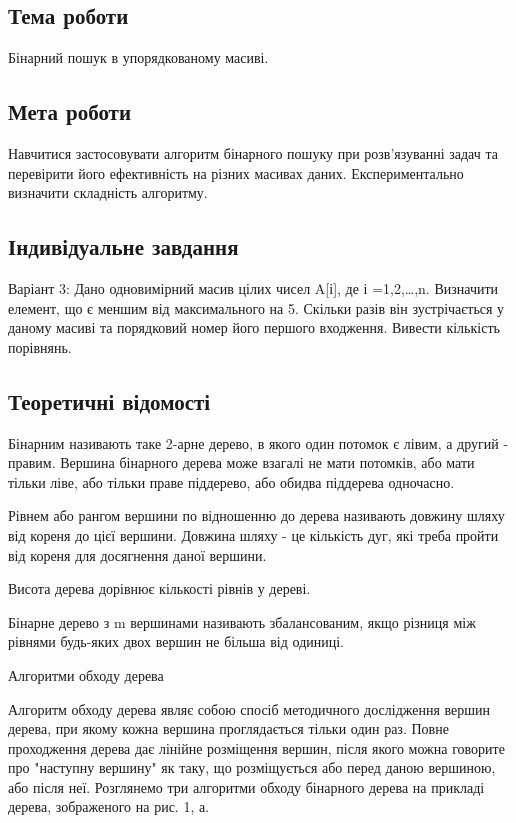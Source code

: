 \documentclass[12pt]{extarticle}
\begin{document}
\subsection*{Тема роботи} 
Бінарний пошук в упорядкованому масиві.

\subsection*{Мета роботи} Навчитися застосовувати алгоритм бінарного пошуку при розв’язуванні задач та перевірити його ефективність на різних масивах даних. Експериментально визначити складність алгоритму.

\subsection*{Індивідуальне завдання}
Варіант 3: Дано одновимірний масив цілих чисел A[і], де і =1,2,…,n. Визначити елемент, що є меншим від максимального на 5. Скільки разів він зустрічається у даному масиві та порядковий номер його першого входження. Вивести кількість порівнянь.

\subsection*{Теоретичні відомості}
Бінарним називають таке 2-арне дерево, в якого один потомок є лівим, а другий - правим. Вершина бінарного дерева може взагалі не мати потомків, або мати тільки ліве, або тільки праве піддерево, або обидва піддерева одночасно.

Рівнем або рангом вершини по відношенню до дерева називають довжину шляху від кореня до цієї вершини. Довжина шляху - це кількість дуг, які треба пройти від кореня для досягнення даної вершини.

Висота дерева дорівнює кількості рівнів у дереві.

Бінарне дерево з m вершинами називають збалансованим, якщо різниця між рівнями будь-яких двох вершин не більша від одиниці.

Алгоритми обходу дерева

Алгоритм обходу дерева являє собою спосіб методичного дослідження вершин дерева, при якому кожна вершина проглядається тільки один раз. Повне проходження дерева дає лінійне розміщення вершин, після якого можна говорите про "наступну вершину" як таку, що розміщується або перед даною вершиною, або після неї. Розглянемо три алгоритми обходу бінарного дерева на прикладі дерева, зображеного на рис. 1, а.
\end{document}
